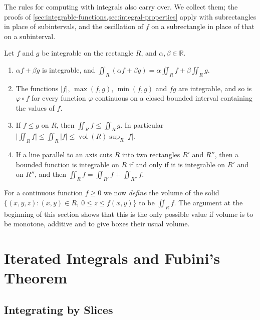 The rules for computing with integrals also carry over. We collect them; the proofs of \cref{sec:integrable-functions,sec:integral-properties} apply with subrectangles in place of subintervals, and the oscillation of $f$ on a subrectangle in place of that on a subinterval.

\begin{theorem}
\label{thm:double-properties}
Let $f$ and $g$ be integrable on the rectangle $R$, and $\alpha,\beta\in\mathbb R$.
\begin{enumerate}
\item $\alpha f+\beta g$ is integrable, and $\iint_R(\alpha f+\beta g)=\alpha\iint_Rf+\beta\iint_Rg$.
\item The functions $|f|$, $\max(f,g)$, $\min(f,g)$ and $fg$ are integrable, and so is $\varphi\circ f$ for every function $\varphi$ continuous on a closed bounded interval containing the values of $f$.
\item If $f\le g$ on $R$, then $\iint_Rf\le\iint_Rg$. In particular $\bigl|\iint_Rf\bigr|\le\iint_R|f|\le\operatorname{vol}(R)\sup_R|f|$.
\item If a line parallel to an axis cuts $R$ into two rectangles $R'$ and $R''$, then a bounded function is integrable on $R$ if and only if it is integrable on $R'$ and on $R''$, and then $\iint_Rf=\iint_{R'}f+\iint_{R''}f$.
\end{enumerate}
\end{theorem}

For a continuous function $f\ge0$ we now \emph{define} the volume of the solid $\{(x,y,z): (x,y)\in R,\ 0\le z\le f(x,y)\}$ to be $\iint_Rf$. The argument at the beginning of this section shows that this is the only possible value if volume is to be monotone, additive and to give boxes their usual volume.

\section{Iterated Integrals and Fubini's Theorem}
\label{sec:fubini}

\subsection{Integrating by Slices}

